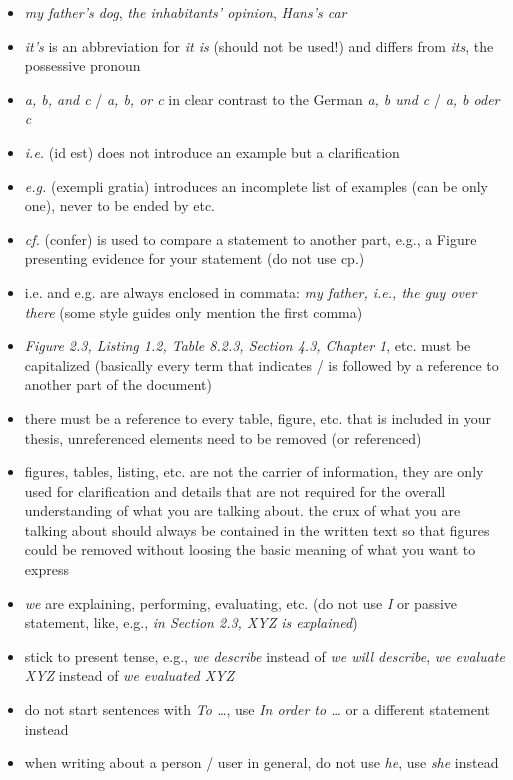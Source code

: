 \documentclass{article}
\begin{document}
\begin{itemize}
	\item \emph{my father's dog}, \emph{the inhabitants' opinion}, \emph{Hans's car}
	\item \emph{it's} is an abbreviation for \emph{it is} (should not be used!) and differs from \emph{its}, the possessive pronoun
	\item \emph{a, b, and c} / \emph{a, b, or c} in clear contrast to the German \emph{a, b und c} / \emph{a, b oder c}
	\item \emph{i.e.} (id est) does not introduce an example but a clarification
	\item \emph{e.g.} (exempli gratia) introduces an incomplete list of examples (can be only one), never to be ended by etc.
	\item \emph{cf.} (confer) is used to compare a statement to another part, e.g., a Figure presenting evidence for your statement (do not use cp.)
	\item i.e. and e.g. are always enclosed in commata: \emph{my father, i.e., the guy over there} (some style guides only mention the first comma)
	\item \emph{Figure 2.3, Listing 1.2, Table 8.2.3, Section 4.3, Chapter 1}, etc. must be capitalized (basically every term that indicates / is followed by a reference to another part of the document)
	\item there must be a reference to every table, figure, etc. that is included in your thesis, unreferenced elements need to be removed (or referenced)
	\item figures, tables, listing, etc. are not the carrier of information, they are only used for clarification and details that are not required for the overall understanding of what you are talking about. the crux of what you are talking about should always be contained in the written text so that figures could be removed without loosing the basic meaning of what you want to express
	\item \emph{we} are explaining, performing, evaluating, etc. (do not use \emph{I} or passive statement, like, e.g., \emph{in Section 2.3, XYZ is explained})
	\item stick to present tense, e.g., \emph{we describe} instead of \emph{we will describe}, \emph{we evaluate XYZ} instead of \emph{we evaluated XYZ}
	\item do not start sentences with \emph{To \dots}, use \emph{In order to \dots} or a different statement instead
	\item when writing about a person / user in general, do not use \emph{he}, use \emph{she} instead

\end{itemize}
\end{document}
